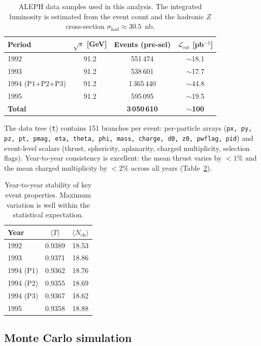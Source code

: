 \documentclass[11pt,a4paper]{article}
\begin{document}
\begin{table}[htbp]
\centering
\caption{ALEPH data samples used in this analysis.  The integrated
  luminosity is estimated from the event count and the hadronic
  $Z$ cross-section $\sigma_\text{had} \approx 30.5$~nb.}
\label{tbl:data}
\begin{tabular}{lccc}
\toprule
Period & $\sqrt{s}$ [GeV] & Events (pre-sel) &
  $\mathcal{L}_\text{est}$ [pb$^{-1}$] \\
\midrule
1992 & 91.2 & 551\,474 & $\sim$18.1 \\
1993 & 91.2 & 538\,601 & $\sim$17.7 \\
1994 (P1+P2+P3) & 91.2 & 1\,365\,440 & $\sim$44.8 \\
1995 & 91.2 & 595\,095 & $\sim$19.5 \\
\midrule
\textbf{Total} & & \textbf{3\,050\,610} & $\sim$\textbf{100} \\
\bottomrule
\end{tabular}
\end{table}

The data tree (\texttt{t}) contains 151 branches per event: per-particle
arrays (\texttt{px, py, pz, pt, pmag, eta, theta, phi, mass, charge,
d0, z0, pwflag, pid}) and event-level scalars (thrust, sphericity,
aplanarity, charged multiplicity, selection flags).  Year-to-year
consistency is excellent: the mean thrust varies by $<\!1\%$ and the
mean charged multiplicity by $<\!2\%$ across all years
(Table~\ref{tbl:year-stability}).

\begin{table}[htbp]
\centering
\caption{Year-to-year stability of key event properties.  Maximum
  variation is well within the statistical expectation.}
\label{tbl:year-stability}
\begin{tabular}{lcc}
\toprule
Year & $\langle T \rangle$ & $\langle N_\text{ch} \rangle$ \\
\midrule
1992 & 0.9389 & 18.53 \\
1993 & 0.9371 & 18.86 \\
1994 (P1) & 0.9362 & 18.76 \\
1994 (P2) & 0.9355 & 18.69 \\
1994 (P3) & 0.9367 & 18.62 \\
1995 & 0.9358 & 18.88 \\
\bottomrule
\end{tabular}
\end{table}

\subsection{Monte Carlo simulation}
\label{sec:data-mc}
\end{document}
